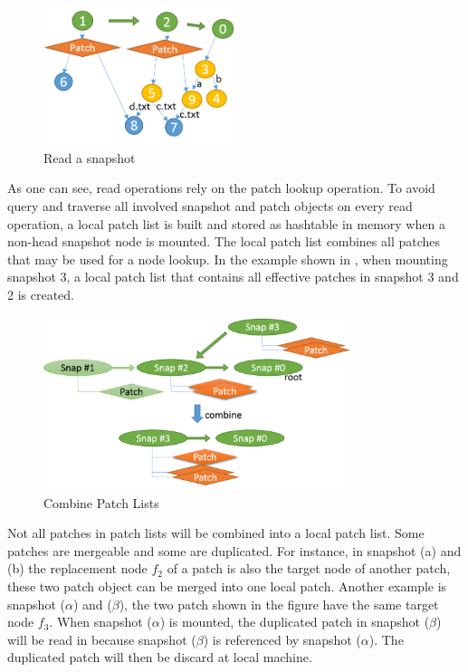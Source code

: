 \begin{figure}[hbtp]
\centering
\includegraphics[width=0.5\textwidth]{Chapter-4/figs/fig18.png}
\caption{Read a snapshot}
\label{fig:read_patches}
\end{figure}

    As one can see, read operations rely on the patch lookup operation. To avoid query and traverse all involved snapshot and patch objects on every read operation, a local patch list is built and stored as hashtable in memory when a non-head snapshot node is mounted. The local patch list combines all patches that may be used for a node lookup. In the example shown in , when mounting snapshot 3, a local patch list that contains all effective patches in snapshot 3 and 2 is created.

\begin{figure}[hbtp]
\centering
\includegraphics[width=0.8\textwidth]{Chapter-4/figs/fig15.png}
\caption{Combine Patch Lists}
\label{fig:combine_patch_list}
\end{figure}

    Not all patches in patch lists will be combined into a local patch list. Some patches are mergeable and some are duplicated. For instance, in  snapshot (a) and (b) the replacement node $f_2$ of a patch is also the target node of another patch, these two patch object can be merged into one local patch. Another example is snapshot ($\alpha$) and ($\beta$), the two patch shown in the figure have the same target node $f_3$. When snapshot ($\alpha$) is mounted, the duplicated patch in snapshot ($\beta$) will be read in because snapshot ($\beta$) is referenced by snapshot ($\alpha$). The duplicated patch will then be discard at local machine.

